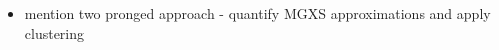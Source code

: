 \begin{abstractpage}

\begin{itemize}[noitemsep]
  \item mention two pronged approach - quantify MGXS approximations and apply clustering
\end{itemize}

\end{abstractpage}
